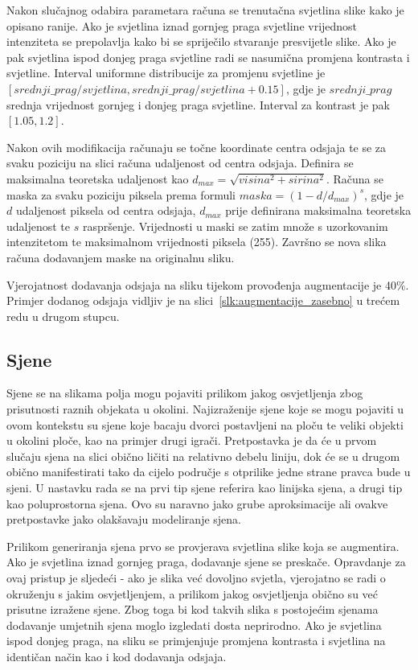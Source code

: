 \documentclass[diplomskirad]{fer}
\begin{document}
			Nakon slučajnog odabira parametara računa se trenutačna svjetlina slike kako je opisano ranije. Ako je svjetlina iznad gornjeg praga svjetline vrijednost intenziteta se prepolavlja kako bi se spriječilo stvaranje presvijetle slike. Ako je pak svjetlina ispod donjeg praga svjetline radi se nasumična promjena kontrasta i svjetline. Interval uniformne distribucije za promjenu svjetline je $[srednji\_prag / svjetlina, srednji\_prag / svjetlina + 0.15]$, gdje je $srednji\_prag$ srednja vrijednost gornjeg i donjeg praga svjetline. Interval za kontrast je pak $[1.05, 1.2]$.
			
			Nakon ovih modifikacija računaju se točne koordinate centra odsjaja te se za svaku poziciju na slici računa udaljenost od centra odsjaja. Definira se maksimalna teoretska udaljenost kao $d_{max} = \sqrt{visina^2 + sirina^2}$. Računa se maska za svaku poziciju piksela prema formuli $maska = (1 - d / d_{max})^s$, gdje je $d$ udaljenost piksela od centra odsjaja, $d_{max}$ prije definirana maksimalna teoretska udaljenost te $s$ raspršenje. Vrijednosti u maski se zatim množe s uzorkovanim intenzitetom te maksimalnom vrijednosti piksela (255). Završno se nova slika računa dodavanjem maske na originalnu sliku.
			
			Vjerojatnost dodavanja odsjaja na sliku tijekom provođenja augmentacije je 40\%. Primjer dodanog odsjaja vidljiv je na slici~\ref{slk:augmentacije_zasebno} u trećem redu u drugom stupcu.
		
		\subsection{Sjene}
			Sjene se na slikama polja mogu pojaviti prilikom jakog osvjetljenja zbog prisutnosti raznih objekata u okolini. Najizraženije sjene koje se mogu pojaviti u ovom kontekstu su sjene koje bacaju dvorci postavljeni na ploču te veliki objekti u okolini ploče, kao na primjer drugi igrači. Pretpostavka je da će u prvom slučaju sjena na slici obično ličiti na relativno debelu liniju, dok će se u drugom obično manifestirati tako da cijelo područje s otprilike jedne strane pravca bude u sjeni. U nastavku rada se na prvi tip sjene referira kao linijska sjena, a drugi tip kao poluprostorna sjena. Ovo su naravno jako grube aproksimacije ali ovakve pretpostavke jako olakšavaju modeliranje sjena.
			
			Prilikom generiranja sjena prvo se provjerava svjetlina slike koja se augmentira. Ako je svjetlina iznad gornjeg praga, dodavanje sjene se preskače. Opravdanje za ovaj pristup je sljedeći - ako je slika već dovoljno svjetla, vjerojatno se radi o okruženju s jakim osvjetljenjem, a prilikom jakog osvjetljenja obično su već prisutne izražene sjene. Zbog toga bi kod takvih slika s postojećim sjenama dodavanje umjetnih sjena moglo izgledati dosta neprirodno. Ako je svjetlina ispod donjeg praga, na sliku se primjenjuje promjena kontrasta i svjetlina na identičan način kao i kod dodavanja odsjaja.
			
\end{document}
